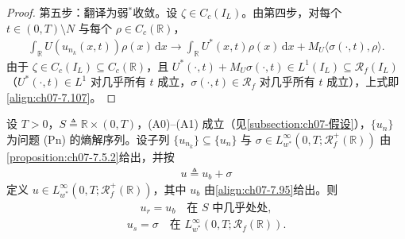\documentclass[../../main.tex]{subfiles}%
\begin{document}
\begin{proof}
第五步：翻译为弱$^*$收敛。设 $\zeta\in C_c(I_L)$。由第四步，对每个 $t\in(0,T)\setminus N$ 与每个 $\rho\in C_c(\mathbb{R})$，
\begin{align*}
\int_{\mathbb{R}}U(u_{n_k}(x,t))\rho(x)\,\mathrm{d}x\to\int_{\mathbb{R}}U^*(x,t)\rho(x)\,\mathrm{d}x+M_U\langle\sigma(\cdot,t),\rho\rangle.
\end{align*}
由于 $\zeta\in C_c(I_L)\subseteq C_c(\mathbb{R})$，且 $U^*(\cdot,t)+M_U\sigma(\cdot,t)\in L^1(I_L)\subseteq\mathscr{R}_f(I_L)$（$U^*(\cdot,t)\in L^1$ 对几乎所有 $t$ 成立，$\sigma(\cdot,t)\in\mathscr{R}_f$ 对几乎所有 $t$ 成立），上式即\eqref{align:ch07-7.107}。
\end{proof}

\begin{proposition}\label{proposition:ch07-7.5.5}
设 $T>0$，$S\triangleq\mathbb{R}\times(0,T)$，(A0)--(A1) 成立（见\cref{subsection:ch07-假设}），$\{u_n\}$ 为问题 (Pn) 的熵解序列。设子列 $\{u_{n_k}\}\subseteq\{u_n\}$ 与 $\sigma\in L^\infty_{w^*}(0,T;\mathscr{R}_f^+(\mathbb{R}))$ 由\cref{proposition:ch07-7.5.2}给出，并按
\begin{align}
u\triangleq u_b+\sigma \label{align:ch07-7.108}
\end{align}
定义 $u\in L^\infty_{w^*}(0,T;\mathscr{R}_f^+(\mathbb{R}))$，其中 $u_b$ 由\eqref{align:ch07-7.95}给出。则
\begin{align}
u_r=u_b\quad\text{在 }S\text{ 中几乎处处}, \label{align:ch07-7.109a}
\end{align}
\begin{align}
u_s=\sigma\quad\text{在 }L^\infty_{w^*}(0,T;\mathscr{R}_f(\mathbb{R})). \label{align:ch07-7.109b}
\end{align}
\end{proposition}
\end{document}
